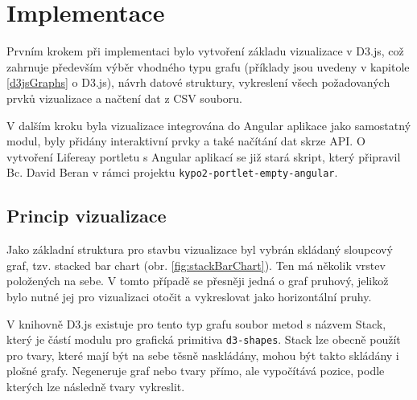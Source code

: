 \documentclass[
  digital, %
  oneside, %
  table,   %
  nolof,     %
  nolot,     %
]{fithesis3}
\begin{document}
\chapter{Implementace}
Prvním krokem při implementaci bylo vytvoření základu vizualizace v D3.js, což zahrnuje především výběr vhodného typu grafu (příklady jsou uvedeny v kapitole \ref{d3jsGraphs} o D3.js), návrh datové struktury, vykreslení všech požadovaných prvků vizualizace a načtení dat z CSV souboru.\par
V dalším kroku byla vizualizace integrována do Angular aplikace jako samostatný modul, byly přidány interaktivní prvky a také načítání dat skrze API. O vytvoření Lifereay portletu s Angular aplikací se již stará skript, který připravil Bc. David Beran v rámci projektu \verb|kypo2-portlet-empty-angular|.
\section{Princip vizualizace}
Jako základní struktura pro stavbu vizualizace byl vybrán skládaný sloupcový graf, tzv. stacked bar chart (obr. \ref{fig:stackBarChart}). Ten má několik vrstev položených na sebe. V tomto případě se přesněji jedná o graf pruhový, jelikož bylo nutné jej pro vizualizaci otočit a vykreslovat jako horizontální pruhy.\par
V knihovně D3.js existuje pro tento typ grafu soubor metod s názvem Stack, který je částí modulu pro grafická primitiva \verb|d3-shapes|. Stack lze obecně použít pro tvary, které mají být na sebe těsně naskládány, mohou být takto skládány i plošné grafy. Negeneruje graf nebo tvary přímo, ale vypočítává pozice, podle kterých lze následně tvary vykreslit. \cite{d3jsorg}\par
\end{document}

